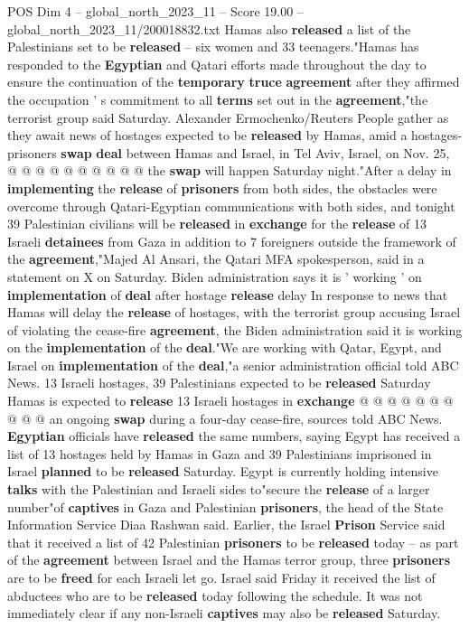\begin{textsample}{POS Dim 4 – global\_north\_2023\_11 – Score 19.00 – global\_north\_2023\_11/200018832.txt}
Hamas also \textbf{released} a list of the Palestinians set to be \textbf{released} -- six women and 33 teenagers."Hamas has responded to the \textbf{Egyptian} and Qatari efforts made throughout the day to ensure the continuation of the \textbf{temporary} \textbf{truce} \textbf{agreement} after they affirmed the occupation ' s commitment to all \textbf{terms} set out in the \textbf{agreement},"the terrorist group said Saturday.
Alexander Ermochenko/Reuters People gather as they await news of hostages expected to be \textbf{released} by Hamas, amid a hostages-prisoners \textbf{swap} \textbf{deal} between Hamas and Israel, in Tel Aviv, Israel, on Nov. 25, @ @ @ @ @ @ @ @ @ @ the \textbf{swap} will happen Saturday night."After a delay in \textbf{implementing} the \textbf{release} of \textbf{prisoners} from both sides, the obstacles were overcome through Qatari-Egyptian communications with both sides, and tonight 39 Palestinian civilians will be \textbf{released} in \textbf{exchange} for the \textbf{release} of 13 Israeli \textbf{detainees} from Gaza in addition to 7 foreigners outside the framework of the \textbf{agreement},"Majed Al Ansari, the Qatari MFA spokesperson, said in a statement on X on Saturday.
Biden administration says it is ' working ' on \textbf{implementation} of \textbf{deal} after hostage \textbf{release} delay In response to news that Hamas will delay the \textbf{release} of hostages, with the terrorist group accusing Israel of violating the cease-fire \textbf{agreement}, the Biden administration said it is working on the \textbf{implementation} of the \textbf{deal}."We are working with Qatar, Egypt, and Israel on \textbf{implementation} of the \textbf{deal},"a senior administration official told ABC News. 13 Israeli hostages, 39 Palestinians expected to be \textbf{released} Saturday Hamas is expected to \textbf{release} 13 Israeli hostages in \textbf{exchange} @ @ @ @ @ @ @ @ @ @ an ongoing \textbf{swap} during a four-day cease-fire, sources told ABC News. \textbf{Egyptian} officials have \textbf{released} the same numbers, saying Egypt has received a list of 13 hostages held by Hamas in Gaza and 39 Palestinians imprisoned in Israel \textbf{planned} to be \textbf{released} Saturday.
Egypt is currently holding intensive \textbf{talks} with the Palestinian and Israeli sides to"secure the \textbf{release} of a larger number"of \textbf{captives} in Gaza and Palestinian \textbf{prisoners}, the head of the State Information Service Diaa Rashwan said.
Earlier, the Israel \textbf{Prison} Service said that it received a list of 42 Palestinian \textbf{prisoners} to be \textbf{released} today -- as part of the \textbf{agreement} between Israel and the Hamas terror group, three \textbf{prisoners} are to be \textbf{freed} for each Israeli let go.
Israel said Friday it received the list of abductees who are to be \textbf{released} today following the schedule.
It was not immediately clear if any non-Israeli \textbf{captives} may also be \textbf{released} Saturday.

\end{textsample}
